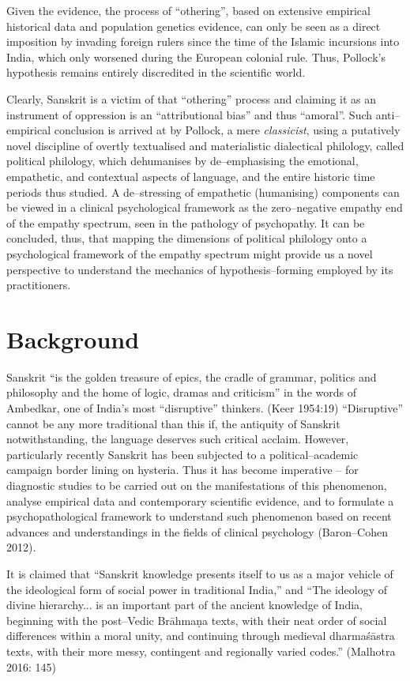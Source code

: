 Given the evidence, the process of “othering”, based on extensive empirical historical data and population genetics evidence, can only be seen as a direct imposition by invading foreign rulers since the time of the Islamic incursions into India, which only worsened during the European colonial rule. Thus, Pollock’s hypothesis remains entirely discredited in the scientific world.

Clearly, Sanskrit is a victim of that “othering” process and claiming it as an instrument of oppression is an “attributional bias” and thus “amoral”. Such anti–empirical conclusion is arrived at by Pollock, a mere \textit{classicist}, using a putatively novel discipline of overtly textualised and materialistic dialectical philology, called political philology, which dehumanises by de–emphasising the emotional, empathetic, and contextual aspects of language, and the entire historic time periods thus studied. A de–stressing of empathetic (humanising) components can be viewed in a clinical psychological framework as the zero–negative empathy end of the empathy spectrum, seen in the pathology of psychopathy. It can be concluded, thus, that mapping the dimensions of political philology onto a psychological framework of the empathy spectrum might provide us a novel perspective to understand the mechanics of hypothesis–forming employed by its practitioners.


\section*{Background}

Sanskrit “is the golden treasure of epics, the cradle of grammar, politics and philosophy and the home of logic, dramas and criticism” in the words of Ambedkar, one of India’s most “disruptive” thinkers. (Keer 1954:19) “Disruptive” cannot be any more traditional than this if, the antiquity of Sanskrit notwithstanding, the language deserves such critical acclaim. However, particularly recently Sanskrit has been subjected to a political–academic campaign border lining on hysteria. Thus it has become imperative – for diagnostic studies to be carried out on the manifestations of this phenomenon, analyse empirical data and contemporary scientific evidence, and to formulate a psychopathological framework to understand such phenomenon based on recent advances and understandings in the fields of clinical psychology (Baron–Cohen 2012).

It is claimed that “Sanskrit knowledge presents itself to us as a major vehicle of the ideological form of social power in traditional India,” and “The ideology of divine hierarchy... is an important part of the ancient knowledge of India, beginning with the post–Vedic Brāhmaṇa texts, with their neat order of social differences within a moral unity, and continuing through medieval dharmaśāstra texts, with their more messy, contingent and regionally varied codes.” (Malhotra 2016: 145)

